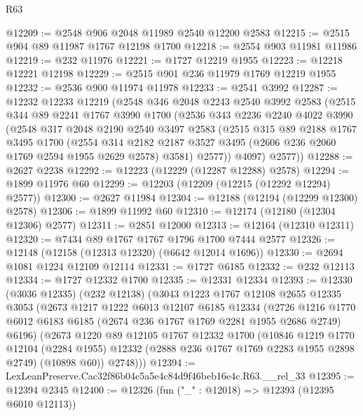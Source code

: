\begin{lexlean}{R63}
\begin{coremodule}
@12209 := @2548 @906 @2048 @11989 @2540 @12200 @2583
@12215 := @2515 @904 @89 @11987 @1767 @12198 @1700
@12218 := @2554 @903 @11981 @11986
@12219 := @232 @11976
@12221 := @1727 @12219 @1955
@12223 := @12218 @12221 @12198
@12229 := @2515 @901 @236 @11979 @1769 @12219 @1955
@12232 := @2536 @900 @11974 @11978
@12233 := @2541 @3992
@12287 := @12232
    @12233
    @12219
    (@2548
      @346
      @2048
      @2243
      @2540
      @3992
      @2583
      (@2515
        @344
        @89
        @2241
        @1767
        @3990
        @1700
        (@2536
          @343
          @2236
          @2240
          @4022
          @3990
          (@2548
            @317
            @2048
            @2190
            @2540
            @3497
            @2583
            (@2515
              @315
              @89
              @2188
              @1767
              @3495
              @1700
              (@2554
                @314
                @2182
                @2187
                @3527
                @3495
                (@2606 @236 @2060 @1769 @2594 @1955 @2629 @2578)
                @3581)
              @2577))
          @4097)
        @2577))
@12288 := @2627 @2238
@12292 := @12223 (@12229 (@12287 @12288) @2578)
@12294 := @1899 @11976 @60
@12299 := @12203 (@12209 (@12215 (@12292 @12294) @2577))
@12300 := @2627 @11984
@12304 := @12188 (@12194 (@12299 @12300) @2578)
@12306 := @1899 @11992 @60
@12310 := @12174 (@12180 (@12304 @12306) @2577)
@12311 := @2851 @12000
@12313 := @12164 (@12310 @12311)
@12320 := @7434 @89 @1767 @1767 @1796 @1700 @7444 @2577
@12326 := @12148 (@12158 (@12313 @12320) (@6642 @12014 @1696))
@12330 := @2694 @1081 @1224 @12109 @12114
@12331 := @1727 @6185
@12332 := @232 @12113
@12334 := @1727 @12332 @1700
@12335 := @12331 @12334
@12393 := @12330
    (@3036 @12335)
    (@232 @12138)
    (@3043
      @1223
      @1767
      @12108
      @2655
      @12335
      @3053
      (@2673
        @1217
        @1222
        @6013
        @12107
        @6185
        @12334
        (@2726 @1216 @1770 @6012 @6183 @6185 (@2674 @236 @1767 @1769 @2281 @1955 @2686 @2749) @6196)
        (@2673
          @1220
          @89
          @12105
          @1767
          @12332
          @1700
          (@10846
            @1219
            @1770
            @12104
            (@2284 @1955)
            @12332
            (@2888 @236 @1767 @1769 @2283 @1955 @2898 @2749)
            (@10898 @60))
          @2748)))
@12394 := LexLeanPreserve.Cac32f86b04c5a5e4c84d9f46beb16e4c.R63.__rel_33
@12395 := @12394 @2345
@12400 := @12326 (fun ("_" : @12018) => @12393 (@12395 @6010 @12113))

\end{coremodule}
\end{lexlean}
